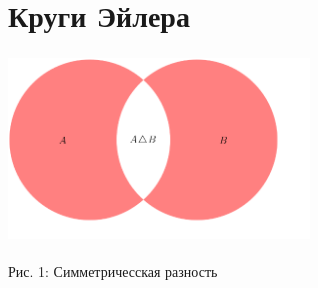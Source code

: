 \section{Круги Эйлера}
\color{red}{\[ (A \cap B) \setminus (A \cup B)\]}

\color{black}

\begin{center}
\includegraphics[width=8cm, height=5cm]{setPicture.png}
\end{center}

\begin{center}
Рис. 1: Симметричесская разность
\end{center}